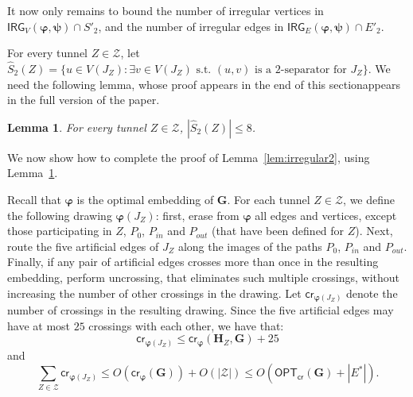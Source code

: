\documentclass[twoside,leqno,twocolumn]{article}
\newcommand{\zset}{{\mathcal{Z}}}
\newtheorem{lemma}{Lemma}
\newcommand{\optcro}[1]{\mathsf{OPT}_{\mathsf{cr}}(#1)}
\newcommand{\cro}{\mathsf{cr}}
\newcommand{\irreg}{\mathsf{IRG}}
\newcommand{\G}{{\mathbf{G}}}
\renewcommand{\H}{{\mathbf{H}}}
\newcommand{\bphi}{{\boldsymbol{\varphi}}}
\newcommand{\bpsi}{{\boldsymbol{\psi}}}
\begin{document}
It now only remains to bound the number of irregular vertices in $\irreg_V(\bphi,\bpsi)\cap S'_2$, and the number of irregular edges in $\irreg_E(\bphi,\bpsi)\cap E'_2$.


For every tunnel $Z\in\zset$, let $\hat{S}_2(Z)=\{u\in V(J_Z):\exists v\in V(J_Z)\text{ s.t. } (u,v) \text{ is a 2-separator for } J_Z\}$.
We need the following lemma, whose proof \iffull appears in the end of this section\fi \ifabstract appears in the full version of the paper\fi.

\begin{lemma} \label{lem:JZ-connected}
For every tunnel $Z\in \zset$, $|\hat{S}_2(Z)|\leq 8$.
\end{lemma}

We now show how to complete the proof of
Lemma~\ref{lem:irregular2}, using Lemma~\ref{lem:JZ-connected}.

Recall that $\bphi$ is the optimal embedding of $\G$. For each tunnel $Z\in \zset$, we define the following drawing $\bphi(J_Z)$: first, erase from $\bphi$ all edges and vertices, except those participating in $Z$, $P_0$, $P_{in}$ and $P_{out}$ (that have been defined for $Z$). Next, route the five artificial edges of $J_Z$ along the images of the paths $P_0$, $P_{in}$ and $P_{out}$. Finally, if any pair of artificial edges crosses more than once in the resulting embedding, perform uncrossing, that eliminates such multiple crossings, without increasing the number of other crossings in the drawing. Let $\cro_{\bphi(J_Z)}$ denote the number of crossings in the resulting drawing. Since the five artificial edges may have at most $25$ crossings with each other, we have that:
\[\cro_{\bphi(J_Z)}\leq \cro_{\bphi}(\H_Z,\G)+25\]
and
\[\sum_{Z\in\zset}\cro_{\bphi(J_Z)}\leq O(\cro_{\bphi}(\G))+O(|\zset|)\leq O(\optcro{\G}+|E^*|).\]

\iffalse
Note that every irregular vertex in $J_Z$ w.r.t.~$\bphi_{H}$ and $\bpsi$,
except possibly $u_1$, $v_1$, $u'$ and $v'$, is also an irregular vertex w.r.t.~$\bphi_Z$ and $\bpsi_Z$,
since drawings of all edges incident to it coincide in $\bphi_{H}$ and $\bphi_Z$, and in
$\bpsi$ and $\bpsi_Z$. Similarly, every irregular path (or segment of an irregular path) in $J_Z$  
w.r.t.~$\bphi_{H}$ and $\bpsi$ is also
an irregular path w.r.t.~$\bphi_Z$ and $\bpsi_Z$ unless it starts at $u_1$, $v_1$, $u'$ or $v'$.
\fi
\end{document}
